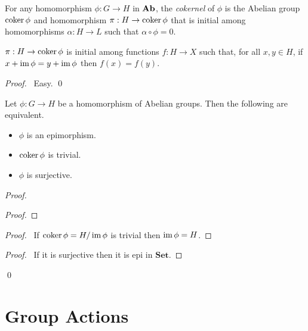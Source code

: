 \begin{df}[Cokernel]
For any homomorphism $\phi : G \rightarrow H$ in $\mathbf{Ab}$, the \emph{cokernel} of $\phi$ is the Abelian group $\operatorname{coker} \phi$ and homomorphism $\pi : H \rightarrow \operatorname{coker} \phi$ that is initial among homomorphisms $\alpha : H \rightarrow L$ such that $\alpha \circ \phi = 0$.
\end{df}

\begin{prop}
$\pi : H \rightarrow \operatorname{coker} \phi$ is initial among functions $f : H \rightarrow X$ such that, for all $x,y \in H$, if $x + \operatorname{im} \phi = y + \operatorname{im} \phi$ then $f(x) = f(y)$.
\end{prop}

\begin{proof}
\pf\ Easy. \qed
\end{proof}

\begin{prop}
Let $\phi : G \rightarrow H$ be a homomorphism of Abelian groups. Then the following are equivalent.
\begin{itemize}
\item $\phi$ is an epimorphism.
\item $\operatorname{coker} \phi$ is trivial.
\item $\phi$ is surjective.
\end{itemize}
\end{prop}

\begin{proof}
\pf
{}
\begin{proof}
\end{proof}
\begin{proof}
	\pf\ If $\operatorname{coker} \phi = H / \operatorname{im} \phi$ is trivial then $\operatorname{im} \phi = H$.
\end{proof}
\begin{proof}
	\pf\ If it is surjective then it is epi in $\mathbf{Set}$.
\end{proof}
\qed
\end{proof}

\chapter{Group Actions}

